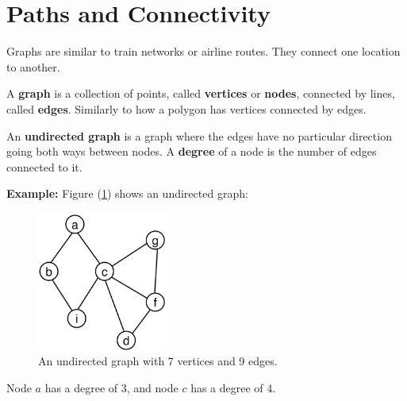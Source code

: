 \section{Paths and Connectivity}
Graphs are similar to train networks or airline routes. They connect one 
location to another.

\begin{Def}[Graph]

    A \textbf{graph} is a collection of points, called \textbf{vertices} or \textbf{nodes}, 
    connected by lines, called \textbf{edges}. Similarly to how a polygon has vertices connected by edges.

\end{Def}
\begin{Def}

    An \textbf{undirected graph} is a graph where the edges have no particular direction going both ways between nodes. 
    A \textbf{degree} of a node is the number of edges connected to it.
\end{Def}
\noindent
\textbf{Example:} Figure (\ref{fig:undir_graph}) shows an undirected graph:\\
\begin{figure}[h]
    \begin{center}
      \includegraphics[height=1.8in]{./Sections/graphs/undir_graph.png}
    \end{center}
     \caption{An undirected graph with 7 vertices and 9 edges.}\label{fig:undir_graph}
  \end{figure}

\noindent
Node $a$ has a degree of 3, and node $c$ has a degree of 4.\\
\newpage

